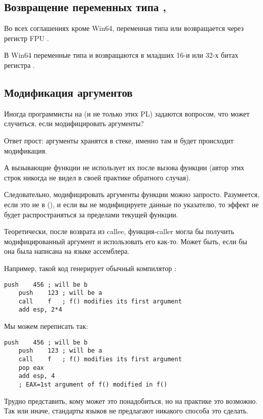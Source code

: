 \subsection{Возвращение переменных типа \Tfloat, \Tdouble}

Во всех соглашениях кроме Win64, переменная типа \Tfloat или \Tdouble возвращается через регистр FPU .

В Win64 переменные типа \Tfloat и \Tdouble возвращаются в младших 16-и или 32-х битах 
регистра .

\subsection{Модификация аргументов}

Иногда программисты на \CCpp{} (и не только этих \ac{PL}) задаются вопросом,
что может случиться, если модифицировать аргументы?

Ответ прост: аргументы хранятся в стеке, именно там и будет происходит модификация.

А вызывающие функции не использует их после вызова функции (автор этих строк никогда не видел в своей практике обратного случая).






Следовательно, модифицировать аргументы функции можно запросто.
Разумеется, если это не  в \Cpp{} (),
и если вы не модифицируете данные по указателю, 
то эффект не будет распространяться за пределами текущей функции.

Теоретически, после возврата из \gls{callee},
функция-\gls{caller} могла бы получить модифицированный аргумент и использовать его как-то.
Может быть, если бы она была написана на языке ассемблера.

Например, такой код генерирует обычный компилятор \CCpp:

\begin{lstlisting}[style=customasm]
	push	456	; will be b
	push	123	; will be a
	call	f	; f() modifies its first argument
	add	esp, 2*4
\end{lstlisting}

Мы можем переписать так:

\begin{lstlisting}[style=customasm]
	push	456	; will be b
	push	123	; will be a
	call	f	; f() modifies its first argument
	pop	eax
	add	esp, 4
	; EAX=1st argument of f() modified in f()
\end{lstlisting}

Трудно представить, кому может это понадобиться, но на практике это возможно.
Так или иначе, стандарты языков \CCpp не предлагают никакого способа это сделать.



